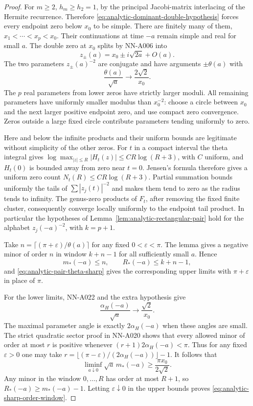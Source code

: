 \begin{proof}
For $m\ge2$, $h_m\ge h_2=1$, by the principal Jacobi-matrix
interlacing of the Hermite recurrence. Therefore
\eqref{eq:analytic-dominant-double-hypothesis} forces every endpoint
zero below $x_0$ to be simple. There are finitely many of them,
$x_1<\cdots<x_p<x_0$. Their continuations at time $-a$ remain
simple and real for small $a$. The double zero at $x_0$ splits by
NN-A006 into
\[
             z_\pm(a)=x_0\pm i\sqrt{2a}+O(a).
\]
The two parameters $z_\pm(a)^{-2}$ are conjugate and have arguments
$\pm\theta(a)$ with
\begin{equation}\label{eq:analytic-pair-theta-sharp}
                         \frac{\theta(a)}{\sqrt a}
                                      \longrightarrow\frac{2\sqrt2}{x_0}.
\end{equation}
The $p$ real parameters from lower zeros have strictly larger moduli.
All remaining parameters have uniformly smaller modulus than
$x_0^{-2}$: choose a circle between $x_0$ and the next larger positive
endpoint zero, and use compact zero convergence. Zeros outside a
large fixed circle contribute parameters tending uniformly to zero.

Here and below the infinite products and their uniform bounds are
legitimate without simplicity of the other zeros. For $t$ in a compact
interval the theta integral gives
$\log\max_{|z|\le R}|H_t(z)|\le C R\log(R+3)$, with $C$ uniform,
and $H_t(0)$ is bounded away from zero near $t=0$. Jensen's formula
therefore gives a uniform zero count $N_t(R)\le C R\log(R+3)$.
Partial summation bounds uniformly the tails of
$\sum|z_j(t)|^{-2}$ and makes them tend to zero as the radius tends
to infinity. The genus-zero products of $F_t$, after removing the
fixed finite cluster, consequently converge locally uniformly to the
endpoint tail product. In particular the hypotheses of
Lemma~\ref{lem:analytic-rectangular-pair} hold for the alphabet
$z_j(-a)^{-2}$, with $k=p+1$.

Take $n=\lceil(\pi+\varepsilon)/\theta(a)\rceil$ for any fixed
$0<\varepsilon<\pi$. The lemma gives a negative minor of order $n$
in window $k+n-1$ for all sufficiently small $a$. Hence
\[
 m_*(-a)\le n,\qquad R_*(-a)\le k+n-1,
\]
and \eqref{eq:analytic-pair-theta-sharp} gives the corresponding
upper limits with $\pi+\varepsilon$ in place of $\pi$.

For the lower limits, NN-A022 and the extra hypothesis give
\[
 \frac{\alpha_H(-a)}{\sqrt a}\longrightarrow\frac{\sqrt2}{x_0}.
\]
The maximal parameter angle is exactly $2\alpha_H(-a)$ when these
angles are small. The strict quadratic sector proof in NN-A020
shows that every allowed minor of order at most $r$ is positive
whenever $(r+1)2\alpha_H(-a)<\pi$. Thus for any fixed
$\varepsilon>0$ one may take
$r=\lfloor(\pi-\varepsilon)/(2\alpha_H(-a))\rfloor-1$.
It follows that
\[
 \liminf_{a\downarrow0}\sqrt a\,m_*(-a)
                           \ge\frac{\pi x_0}{2\sqrt2}.
\]
Any minor in the window $0,\ldots,R$ has order at most $R+1$,
so $R_*(-a)\ge m_*(-a)-1$. Letting $\varepsilon\downarrow0$
in the upper bounds proves \eqref{eq:analytic-sharp-order-window}.


\end{proof}
